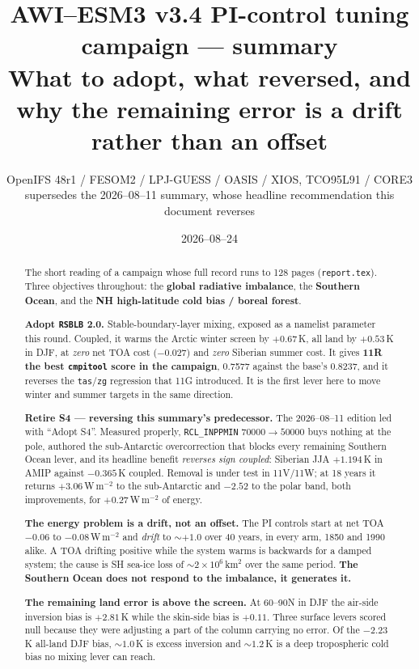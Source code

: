 \documentclass[10pt]{article}
\title{\vspace{-1.4cm}\textbf{AWI--ESM3 v3.4 PI-control tuning campaign --- summary}\\[2pt]
\large What to adopt, what reversed, and why the remaining error is a drift rather than
an offset}
\author{OpenIFS 48r1 / FESOM2 / LPJ-GUESS / OASIS / XIOS, TCO95L91 / CORE3\\[1pt]
\normalsize supersedes the 2026--08--11 summary, whose headline recommendation this
document reverses}
\date{2026--08--24}
\begin{document}
\maketitle
\vspace{-0.7cm}

\begin{abstract}\noindent
The short reading of a campaign whose full record runs to 128 pages
(\texttt{report.tex}). Three objectives throughout: the \textbf{global radiative
imbalance}, the \textbf{Southern Ocean}, and the \textbf{NH high-latitude cold bias /
boreal forest}.

\medskip\noindent\textbf{Adopt \texttt{RSBLB} 2.0.} Stable-boundary-layer mixing, exposed
as a namelist parameter this round. Coupled, it warms the Arctic winter screen by
$+0.67$\,K, all land by $+0.53$\,K in DJF, at \emph{zero} net TOA cost ($-0.027$) and
\emph{zero} Siberian summer cost. It gives \textbf{11R the best \texttt{cmpitool} score in
the campaign}, 0.7577 against the base's 0.8237, and it reverses the \texttt{tas}/\texttt{zg}
regression that 11G introduced. It is the first lever here to move winter and summer
targets in the same direction.

\medskip\noindent\textbf{Retire S4 --- reversing this summary's predecessor.} The
2026--08--11 edition led with ``Adopt S4''. Measured properly, \texttt{RCL\_INPPMIN}
$70000\to50000$ buys nothing at the pole, authored the sub-Antarctic overcorrection that
blocks every remaining Southern Ocean lever, and its headline benefit \emph{reverses sign
coupled}: Siberian JJA $+1.194$\,K in AMIP against $-0.365$\,K coupled. Removal is under
test in 11V/11W; at 18 years it returns $+3.06$\,W\,m$^{-2}$ to the sub-Antarctic and
$-2.52$ to the polar band, both improvements, for $+0.27$\,W\,m$^{-2}$ of energy.

\medskip\noindent\textbf{The energy problem is a drift, not an offset.} The PI controls
start at net TOA $-0.06$ to $-0.08$\,W\,m$^{-2}$ and \emph{drift} to ${\sim}+1.0$ over 40
years, in every arm, 1850 and 1990 alike. A TOA drifting positive while the system warms
is backwards for a damped system; the cause is SH sea-ice loss of ${\sim}2\times10^6$\,km$^2$
over the same period. \textbf{The Southern Ocean does not respond to the imbalance, it
generates it.}

\medskip\noindent\textbf{The remaining land error is above the screen.} At 60--90N in DJF
the air-side inversion bias is $+2.81$\,K while the skin-side bias is $+0.11$. Three
surface levers scored null because they were adjusting a part of the column carrying no
error. Of the $-2.23$\,K all-land DJF bias, ${\sim}1.0$\,K is excess inversion and
${\sim}1.2$\,K is a deep tropospheric cold bias no mixing lever can reach.
\end{abstract}
\end{document}
